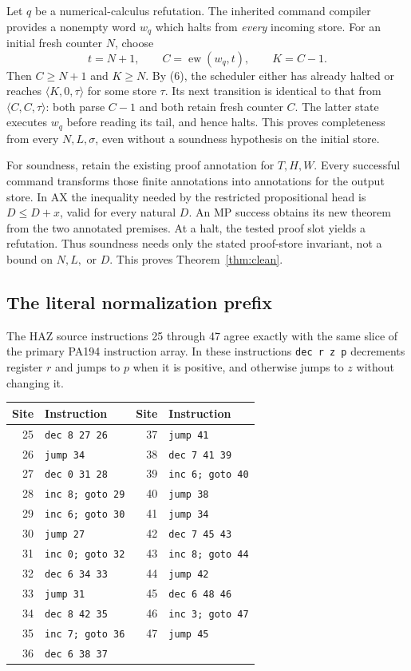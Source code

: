 Let $q$ be a numerical-calculus refutation. The inherited command compiler
provides a nonempty word $w_q$ which halts from \emph{every} incoming store.
For an initial fresh counter $N$, choose
\[
       t=N+1,\qquad C=\operatorname{ew}(w_q,t),\qquad K=C-1.
\tag{8}
\]
Then $C\ge N+1$ and $K\ge N$. By (6), the scheduler either has already
halted or reaches $\langle K,0,\tau\rangle$ for some store $\tau$.
Its next transition is identical to that from
$\langle C,C,\tau\rangle$: both parse $C-1$ and both retain fresh counter
$C$. The latter state executes $w_q$ before reading its tail, and hence
halts. This proves completeness from every $N,L,\sigma$, even without a
soundness hypothesis on the initial store.

For soundness, retain the existing proof annotation for $T,H,W$.
Every successful command transforms those finite annotations into
annotations for the output store. In AX the inequality needed by the
restricted propositional head is $D\le D+x$, valid for every natural $D$.
An MP success obtains its new theorem from the two annotated premises.
At a halt, the tested proof slot yields a refutation. Thus soundness needs
only the stated proof-store invariant, not a bound on $N,L,$ or $D$.
This proves Theorem~\ref{thm:clean}.

\subsection{The literal normalization prefix}

The HAZ source instructions 25 through 47 agree exactly with the same
slice of the primary PA194 instruction array. In these instructions
\texttt{dec r z p} decrements register $r$ and jumps to $p$ when it is
positive, and otherwise jumps to $z$ without changing it.

\begin{center}\small
\begin{tabular}{r l @{\qquad} r l}
\toprule
Site&Instruction&Site&Instruction\\
\midrule
25&\texttt{dec 8 27 26}&37&\texttt{jump 41}\\
26&\texttt{jump 34}&38&\texttt{dec 7 41 39}\\
27&\texttt{dec 0 31 28}&39&\texttt{inc 6; goto 40}\\
28&\texttt{inc 8; goto 29}&40&\texttt{jump 38}\\
29&\texttt{inc 6; goto 30}&41&\texttt{jump 34}\\
30&\texttt{jump 27}&42&\texttt{dec 7 45 43}\\
31&\texttt{inc 0; goto 32}&43&\texttt{inc 8; goto 44}\\
32&\texttt{dec 6 34 33}&44&\texttt{jump 42}\\
33&\texttt{jump 31}&45&\texttt{dec 6 48 46}\\
34&\texttt{dec 8 42 35}&46&\texttt{inc 3; goto 47}\\
35&\texttt{inc 7; goto 36}&47&\texttt{jump 45}\\
36&\texttt{dec 6 38 37}&&\\
\bottomrule
\end{tabular}
\end{center}

